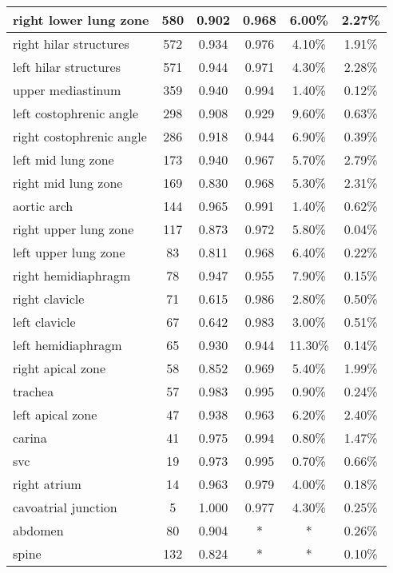 \begin{table}[th]
{\begin{tabular}{|l|c|c|c|c|c|}
right lower lung zone & 580 & 0.902 & 0.968 & 6.00\% & 2.27\% \\ \hline
right hilar structures & 572 & 0.934 & 0.976 & 4.10\% & 1.91\% \\ \hline
left hilar structures & 571 & 0.944 & 0.971 & 4.30\% & 2.28\% \\ \hline
upper mediastinum & 359 & 0.940 & 0.994 & 1.40\% & 0.12\% \\ \hline
left costophrenic angle & 298 & 0.908 & 0.929 & 9.60\% & 0.63\% \\ \hline
right costophrenic angle & 286 & 0.918 & 0.944 & 6.90\% & 0.39\% \\ \hline
left mid lung zone & 173 & 0.940 & 0.967 & 5.70\% & 2.79\% \\ \hline
right mid lung zone & 169 & 0.830 & 0.968 & 5.30\% & 2.31\% \\ \hline
aortic arch & 144 & 0.965 & 0.991 & 1.40\% & 0.62\% \\ \hline
right upper lung zone & 117 & 0.873 & 0.972 & 5.80\% & 0.04\% \\ \hline
left upper lung zone & 83 & 0.811 & 0.968 & 6.40\% & 0.22\% \\ \hline
right hemidiaphragm & 78 & 0.947 & 0.955 & 7.90\% & 0.15\% \\ \hline
right clavicle & 71 & 0.615 & 0.986 & 2.80\% & 0.50\% \\ \hline
left clavicle & 67 & 0.642 & 0.983 & 3.00\% & 0.51\% \\ \hline
left hemidiaphragm & 65 & 0.930 & 0.944 & 11.30\% & 0.14\% \\ \hline
right apical zone & 58 & 0.852 & 0.969 & 5.40\% & 1.99\% \\ \hline
trachea & 57 & 0.983 & 0.995 & 0.90\% & 0.24\% \\ \hline
left apical zone & 47 & 0.938 & 0.963 & 6.20\% & 2.40\% \\ \hline
carina & 41 & 0.975 & 0.994 & 0.80\% & 1.47\% \\ \hline
svc & 19 & 0.973 & 0.995 & 0.70\% & 0.66\% \\ \hline
right atrium & 14 & 0.963 & 0.979 & 4.00\% & 0.18\% \\ \hline
cavoatrial junction & 5 & 1.000 & 0.977 & 4.30\% & 0.25\% \\ \hline
abdomen & 80 & 0.904 & * & * & 0.26\% \\ \hline
spine & 132 & 0.824 & * & * & 0.10\% \\ \hline
\end{tabular}%
}
\vspace{-0.3cm}
\end{table}


